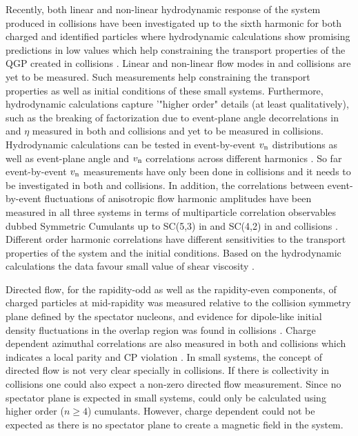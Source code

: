 \documentclass[../report.tex]{subfiles}
\begin{document}
Recently, both linear and non-linear hydrodynamic response of the system produced in \PbPb{} collisions have been investigated up to the sixth harmonic for both charged and identified particles where hydrodynamic calculations show promising predictions in low \pt{} values which help constraining the transport properties of the QGP created in \PbPb{} collisions \cite{Acharya:2017zfg}. Linear and non-linear flow modes in \pp{} and \pPb{} collisions are yet to be measured. Such measurements help constraining the transport properties as well as initial conditions of these small systems. Furthermore, hydrodynamic calculations capture '"higher order" details (at least qualitatively), such as the breaking of factorization due to event-plane angle decorrelations in \pt{} and $\eta$ measured in both \PbPb{} and \pPb{} collisions \cite{Khachatryan:2015oea,Sirunyan:2017gyb,Acharya:2017ino} and yet to be measured in \pp{} collisions. Hydrodynamic calculations can be tested in event-by-event $v_{\rm{n}}$ distributions as well as event-plane angle and $v_{\rm{n}}$ correlations across different harmonics \cite{Aad:2014fla,Aad:2015lwa,ALICE:2016kpq,Sirunyan:2017uyl}. So far event-by-event $v_{\rm{n}}$ measurements have only been done in \PbPb{} collisions \cite{Aad:2013xma,Sirunyan:2017fts} and it needs to be investigated in both \pPb{} and \pp{} collisions. In addition, the correlations between event-by-event fluctuations of anisotropic flow harmonic amplitudes have been measured in all three systems in terms of multiparticle correlation observables dubbed Symmetric Cumulants up to SC(5,3) in \PbPb{} and SC(4,2) in \pPb{} and \pp{} collisions \cite{Sirunyan:2017uyl,Acharya:2017gsw,ATLAS-CONF-2018-012}. Different order harmonic correlations have different sensitivities to the transport properties of the system and the initial conditions. Based on the hydrodynamic calculations the data favour small value of shear viscosity \cite{Zhu:2016puf}.

Directed flow, for the rapidity-odd as well as the rapidity-even components, of charged particles at mid-rapidity was measured relative to the collision symmetry plane defined by the spectator nucleons, and evidence for dipole-like initial density fluctuations in the overlap region was found in \PbPb{} collisions \cite{Abelev:2013cva}. Charge dependent azimuthal correlations are also measured in both \PbPb{} and \pPb{} collisions which indicates a local parity and CP violation \cite{Adam:2015vje,Sirunyan:2017tax,Acharya:2017fau,Sirunyan:2017quh,Khachatryan:2016got}. In small systems, the concept of directed flow is not very clear specially in \pp{} collisions. If there is collectivity in \pp{} collisions one could also expect a non-zero directed flow measurement. Since no spectator plane is expected in small systems, \vone{} could only be calculated using higher order ($n\geq 4$) cumulants. However, charge dependent \vone{} could not be expected as there is no spectator plane to create a magnetic field in the system. 
\end{document}
